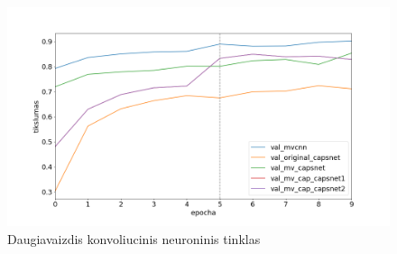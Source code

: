 \begin{figure}[H]
	\centering
	\includegraphics[scale=0.5]{img/validated.png}
	\caption{Daugiavaizdis konvoliucinis neuroninis tinklas}
	\label{img:val_plot}
\end{figure}
